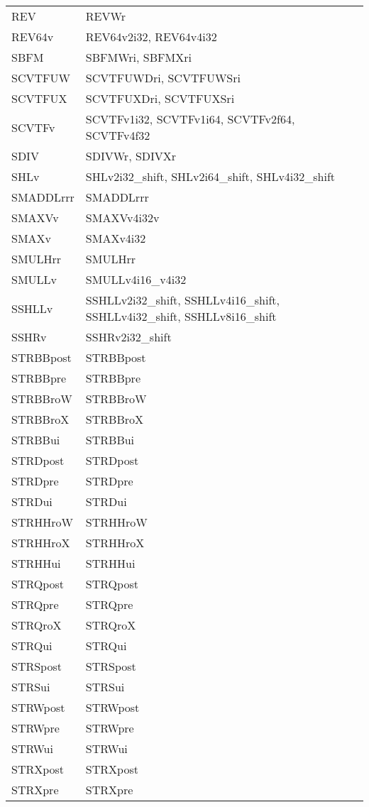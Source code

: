 \begin{xltabular}{\textwidth}{lX}
    REV & REVWr \\
    REV64v & REV64v2i32, REV64v4i32 \\
    SBFM & SBFMWri, SBFMXri \\
    SCVTFUW & SCVTFUWDri, SCVTFUWSri \\
    SCVTFUX & SCVTFUXDri, SCVTFUXSri \\
    SCVTFv & SCVTFv1i32, SCVTFv1i64, SCVTFv2f64, SCVTFv4f32 \\
    SDIV & SDIVWr, SDIVXr \\
    SHLv & SHLv2i32\_shift, SHLv2i64\_shift, SHLv4i32\_shift \\
    SMADDLrrr & SMADDLrrr \\
    SMAXVv & SMAXVv4i32v \\
    SMAXv & SMAXv4i32 \\
    SMULHrr & SMULHrr \\
    SMULLv & SMULLv4i16\_v4i32 \\
    SSHLLv & SSHLLv2i32\_shift, SSHLLv4i16\_shift, SSHLLv4i32\_shift, SSHLLv8i16\_shift \\
    SSHRv & SSHRv2i32\_shift \\
    STRBBpost & STRBBpost \\
    STRBBpre & STRBBpre \\
    STRBBroW & STRBBroW \\
    STRBBroX & STRBBroX \\
    STRBBui & STRBBui \\
    STRDpost & STRDpost \\
    STRDpre & STRDpre \\
    STRDui & STRDui \\
    STRHHroW & STRHHroW \\
    STRHHroX & STRHHroX \\
    STRHHui & STRHHui \\
    STRQpost & STRQpost \\
    STRQpre & STRQpre \\
    STRQroX & STRQroX \\
    STRQui & STRQui \\
    STRSpost & STRSpost \\
    STRSui & STRSui \\
    STRWpost & STRWpost \\
    STRWpre & STRWpre \\
    STRWui & STRWui \\
    STRXpost & STRXpost \\
    STRXpre & STRXpre \\

\end{xltabular}
